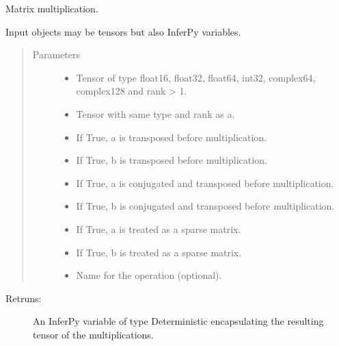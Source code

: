 \documentclass[letterpaper,10pt,english]{sphinxmanual}
\begin{document}

\begin{fulllineitems}
\label{\detokenize{modules/inferpy.util:inferpy.util.ops.matmul}}
Matrix multiplication.

Input objects may be tensors but also InferPy variables.
\begin{quote}\begin{description}
\item[{Parameters}] \leavevmode\begin{itemize}
\item {} 
 \textendash{} Tensor of type float16, float32, float64, int32, complex64, complex128 and rank \textgreater{} 1.

\item {} 
 \textendash{} Tensor with same type and rank as a.

\item {} 
 \textendash{} If True, a is transposed before multiplication.

\item {} 
 \textendash{} If True, b is transposed before multiplication.

\item {} 
 \textendash{} If True, a is conjugated and transposed before multiplication.

\item {} 
 \textendash{} If True, b is conjugated and transposed before multiplication.

\item {} 
 \textendash{} If True, a is treated as a sparse matrix.

\item {} 
 \textendash{} If True, b is treated as a sparse matrix.

\item {} 
 \textendash{} Name for the operation (optional).

\end{itemize}

\end{description}\end{quote}
\begin{description}
\item[{Retruns:}] \leavevmode
An InferPy variable of type Deterministic encapsulating the resulting tensor
of the multiplications.

\end{description}

\end{fulllineitems}
\end{document}
